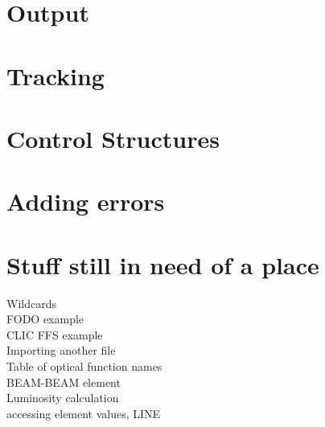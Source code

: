 \documentclass{article}
\begin{document}
\section{Output}



\section{Tracking}



\section{Control Structures}


\section{Adding errors}


\section{Stuff still in need of a place}
Wildcards\\
FODO example\\
CLIC FFS example\\
Importing another file\\
Table of optical function names\\
BEAM-BEAM element\\
Luminosity calculation\\
accessing element values, LINE\\
\end{document}
